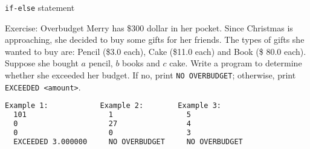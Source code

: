 \documentclass[10pt,xcolor={table,dvipsnames},t]{beamer}
\begin{document}


\begin{frame}[fragile]{\texttt{if-else} statement}
  \begin{exampleblock}{Exercise: Overbudget}
    Merry has \$300 dollar in her pocket. Since Christmas is approaching, she decided to buy some gifts for her friends. The types of gifts she wanted to buy are: Pencil (\$3.0 each), Cake (\$11.0 each) and Book (\$ 80.0 each). Suppose she bought $a$ pencil,  $b$ books and $c$ cake. Write a program to determine whether she exceeded her budget. If no, print \texttt{NO OVERBUDGET}; otherwise, print \texttt{EXCEEDED <amount>}.
  \end{exampleblock}
\begin{lstlisting}[language=bash]
  Example 1:            Example 2:        Example 3:
  101                   1                 5
  0                     27                4
  0                     0                 3
  EXCEEDED 3.000000     NO OVERBUDGET     NO OVERBUDGET    
\end{lstlisting}
\end{frame}
\end{document}
